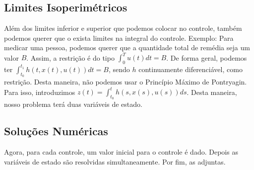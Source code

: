 \subsection{Limites Isoperimétricos}

Além dos limites inferior e superior que podemos colocar no controle, também podemos querer que o exista limites na integral do controle. Exemplo: Para medicar uma pessoa, podemos querer que a quantidade total de remédia seja um valor $B$. 
Assim, a restrição é do tipo $\int_0^T u(t) dt = B$. De forma geral, podemos ter $\int_{t_0}^{t_1} h(t,x(t),u(t)) dt = B$, sendo $h$ continuamente diferenciável, como restrição. Desta maneira, não podemos usar o Princípio Máximo de Pontryagin. Para isso, introduzimos $z(t) = \int_{t_0}^t h(s,x(s),u(s))ds$. Desta maneira, nosso problema terá duas variáveis de estado. 

\subsection{Soluções Numéricas}

Agora, para cada controle, um valor inicial para o controle é dado. Depois as variáveis de estado são resolvidas simultaneamente. Por fim, as adjuntas. 